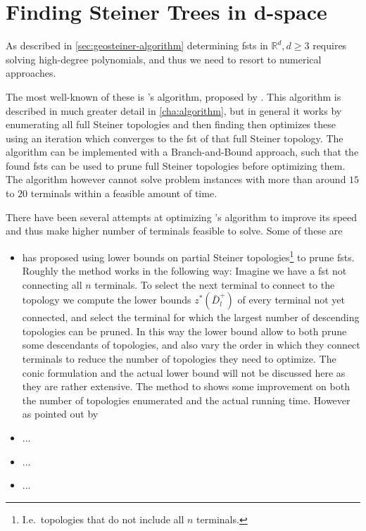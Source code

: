 \section{Finding Steiner Trees in d-space}
\label{sec:find-stein-trees-d}

As described in \cref{sec:geosteiner-algorithm} determining \acp{fst} in
$\mathbb{R}^d, d \ge 3$ requires solving high-degree polynomials, and thus we
need to resort to numerical approaches.

The most well-known of these is \citeauthor{smith1992}'s algorithm, proposed by
\textcite{smith1992}. This algorithm is described in much greater detail in
\cref{cha:algorithm}, but in general it works by enumerating all full Steiner
topologies and then finding then optimizes these using an iteration which
converges to the \ac{fst} of that full Steiner topology. The algorithm can be
implemented with a Branch-and-Bound approach, such that the found \acp{fst} can
be used to prune full Steiner topologies before optimizing them. The algorithm
however cannot solve problem instances with more than around $15$ to $20$
terminals within a feasible amount of time.

There have been several attempts at optimizing \citeauthor{smith1992}'s
algorithm to improve its speed and thus make higher number of terminals feasible
to solve. Some of these are

\begin{itemize}
\item \textcite{fampa2008} has proposed using lower bounds on partial Steiner
  topologies\footnote{I.e.\ topologies that do not include all $n$ terminals.}
  to prune \acp{fst}. Roughly the method works in the following way: Imagine we
  have a \ac{fst} not connecting all $n$ terminals. To select the next terminal
  to connect to the topology we compute the lower bounds
  $z^{\ast}(\bar{D}_l^{+})$ of every terminal not yet connected, and select the
  terminal for which the largest number of descending topologies can be
  pruned. In this way the lower bound allow \citeauthor{fampa2008} to both prune
  some descendants of topologies, and also vary the order in which they connect
  terminals to reduce the number of topologies they need to optimize. The conic
  formulation and the actual lower bound will not be discussed here as they are
  rather extensive. The method to shows some improvement on both the number of
  topologies enumerated and the actual running time. However as pointed out by
\item \textcite{vanlaarhoven2013} ...
\item \textcite{fampa2014} ...
\item \textcite{fonseca2014} ...
\end{itemize}

